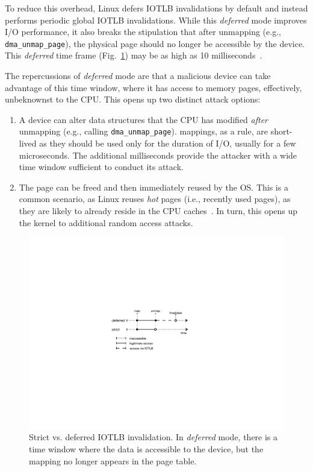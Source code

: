 To reduce this overhead, Linux defers IOTLB invalidations by default and instead performs periodic global IOTLB invalidations. While this \emph{deferred} mode improves I/O performance, it also breaks the stipulation that after unmapping (e.g., \texttt{dma\_unmap\_page}), the physical page should no longer be accessible by the device. This \emph{deferred} time frame (Fig.~\ref{fig:deferred}) may be as high as 10 milliseconds~\cite{MSMT18}.

The repercussions of \emph{deferred} mode are that a malicious device can take advantage of this time window, where it has access to memory pages, effectively, unbeknownst to the CPU. This opens up two distinct attack options:

\begin{enumerate}[labelindent=0pt]
    \item A device can alter data structures that the CPU has modified \emph{after} unmapping (e.g., calling \texttt{dma\_unmap\_page}).
    \iova{} mappings, as a rule, are short-lived as they should be used only for the duration of I/O, usually for a few microseconds. The additional milliseconds provide the attacker with a wide time window sufficient to conduct its attack.
    \item The page can be freed and then immediately reused by the OS. This is a common scenario, as Linux reuses \emph{hot} pages (i.e., recently used pages), as they are likely to already reside in the CPU caches~\cite{hotcold}. In turn, this opens up the kernel to additional random access attacks.
\end{enumerate}

\begin{figure}[t]
    \centering
    \includegraphics[width=0.75\columnwidth]{figs/strict.pdf}
    \caption{Strict vs. deferred IOTLB invalidation. In \emph{deferred} mode, there is a time window where the data is accessible to the device, but the mapping no longer appears in the page table.}
    \label{fig:deferred}
\end{figure}

